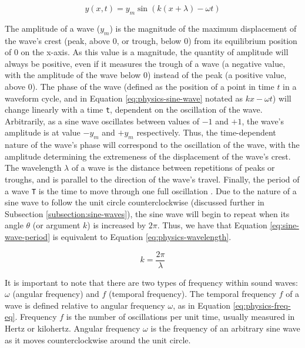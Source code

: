 \begin{equation}
	y(x,t) = y_m \sin(k(x + \lambda) - \omega t)
	\label{eq:physics-sine-wave}
\end{equation}

The amplitude of a wave ($y_m$) is the magnitude of the maximum displacement of the wave's crest (peak, above 0, or trough, below 0) from its equilibrium position of 0 on the x-axis. As this value is a magnitude, the quantity of amplitude will always be positive, even if it measures the trough of a wave (a negative value, with the amplitude of the wave below 0) instead of the peak (a positive value, above 0). The phase of the wave (defined as the position of a point in time $t$ in a waveform cycle, and in Equation \ref{eq:physics-sine-wave} notated as $kx - \omega t$) will change linearly with a time \texttt{t}, dependent on the oscillation of the wave. Arbitrarily, as a sine wave oscillates between values of $-1$ and $+1$, the wave's amplitude is at value $-y_m$ and $+y_m$ respectively. Thus, the time-dependent nature of the wave's phase will correspond to the oscillation of the wave, with the amplitude determining the extremeness of the displacement of the wave's crest. The wavelength $\lambda$ of a wave is the distance between repetitions of peaks or troughs, and is parallel to the direction of the wave's travel. Finally, the period of a wave \texttt{T} is the time to move through one full oscillation \cite{Halliday_Resnick_Walker_2005}. Due to the nature of a sine wave to follow the unit circle counterclockwise (discussed further in Subsection \ref{subsection:sine-waves}), the sine wave will begin to repeat when its angle $\theta$ (or argument $k$) is increased by $2\pi$. Thus, we have that Equation \ref{eq:sine-wave-period} is equivalent to Equation \ref{eq:physics-wavelength}.

\begin{equation}
	k = \frac{2\pi}{\lambda}
	\label{eq:physics-wavelength}
\end{equation}

It is important to note that there are two types of frequency within sound waves: $\omega$ (angular frequency) and $f$ (temporal frequency). The temporal frequency $f$ of a wave is defined relative to angular frequency $\omega$, as in Equation \ref{eq:physics-freq-eq}. Frequency $f$ is the number of oscillations per unit time, usually measured in Hertz or kilohertz. Angular frequency $\omega$ is the frequency of an arbitrary sine wave as it moves counterclockwise around the unit circle.

